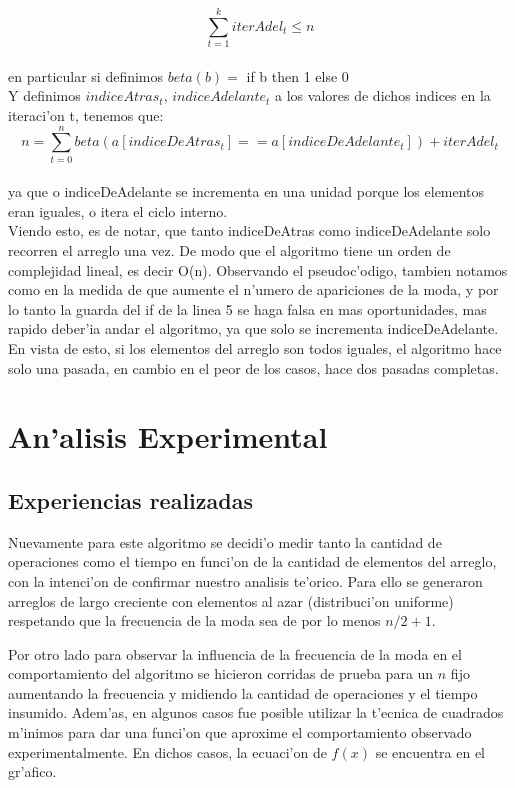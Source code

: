 $$\sum_{t=1}^{k}iterAdel_t \leq n$$\\
en particular si definimos
$beta(b) =$ if b then 1 else 0 \\
Y definimos $indiceAtras_t$, $indiceAdelante_t$ a los valores de dichos indices en la iteraci'on t, tenemos que:\\
$$n=\sum_{t=0}^{n}beta(a[indiceDeAtras_t] == a[indiceDeAdelante_t])+ iterAdel_t$$\\
ya que o indiceDeAdelante se incrementa en una unidad porque los elementos eran iguales, o itera el ciclo interno.\\

Viendo esto, es de notar, que tanto indiceDeAtras como indiceDeAdelante solo recorren el arreglo una vez. De modo que el algoritmo tiene un orden de complejidad lineal, es decir O(n).
Observando el pseudoc'odigo, tambien notamos como en la medida de que aumente el n'umero de apariciones de la moda, y por lo tanto la guarda del if de la linea 5 se haga falsa en mas oportunidades, mas rapido deber'ia andar el algoritmo, ya que solo se incrementa indiceDeAdelante. En vista de esto, si los elementos del arreglo son todos iguales, el algoritmo hace solo una pasada, en cambio en el peor de los casos, hace dos pasadas completas.

\section{An'alisis Experimental}
\subsection{Experiencias realizadas}
Nuevamente para este algoritmo se decidi'o medir tanto la cantidad de operaciones como el tiempo en funci'on de la cantidad de 
elementos del arreglo, con la intenci'on de confirmar nuestro analisis te'orico. Para ello se generaron arreglos de largo creciente 
con elementos al azar (distribuci'on uniforme) respetando que la frecuencia de la moda sea de por lo menos $n/2+1$.

Por otro lado para observar la influencia de la frecuencia de la moda en el comportamiento del algoritmo se hicieron corridas de prueba
para un $n$ fijo aumentando la frecuencia y midiendo la cantidad de operaciones y el tiempo insumido.
Adem'as, en algunos casos fue posible utilizar la t'ecnica de cuadrados m'inimos para dar una funci'on 
que aproxime el comportamiento observado experimentalmente. En dichos casos, la ecuaci'on de $f(x)$ se encuentra en el gr'afico.

